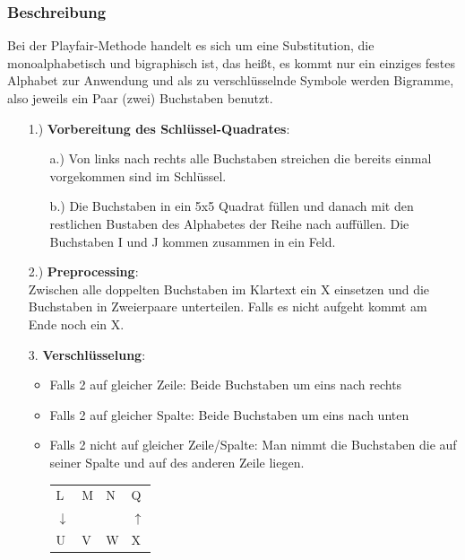 \documentclass[landscape,twocolumn,a4paper]{article}
\begin{document}
\subsubsection{Beschreibung}
Bei der Playfair-Methode handelt es sich um eine Substitution, die monoalphabetisch und bigraphisch ist, das heißt, es kommt nur ein einziges  festes Alphabet zur Anwendung und als zu verschlüsselnde Symbole werden Bigramme, also jeweils ein Paar (zwei) Buchstaben benutzt.
\begin{itemize}
	\item[1.)] \textbf{Vorbereitung des Schlüssel-Quadrates}:
		\begin{itemize}
			\item[a.)] Von links nach rechts alle Buchstaben streichen die bereits einmal vorgekommen sind im Schlüssel.
			\item[b.)] Die Buchstaben in ein 5x5 Quadrat füllen und danach mit den restlichen Bustaben des Alphabetes der Reihe nach auffüllen. Die Buchstaben I und J kommen zusammen in ein Feld.
		\end{itemize}
	\item[2.)] \textbf{Preprocessing}: \\
		Zwischen alle doppelten Buchstaben im Klartext ein X einsetzen und die Buchstaben in Zweierpaare unterteilen. Falls es nicht aufgeht kommt am Ende noch ein X.
	\item[3.] \textbf{Verschlüsselung}:
		\begin{itemize}
 			\item Falls 2 auf gleicher Zeile: Beide Buchstaben um eins nach rechts
			\item Falls 2 auf gleicher Spalte: Beide Buchstaben um eins nach unten
			\item Falls 2 nicht auf gleicher Zeile/Spalte: Man nimmt die Buchstaben die auf seiner Spalte und auf des anderen Zeile liegen.\\
				\begin{tabular}{llll}
  					L&M&N&Q\\
					$\downarrow$&&&$\uparrow$\\
  					U&V&W&X\\
				\end{tabular}
		\end{itemize}
\end{itemize}
\end{document}
